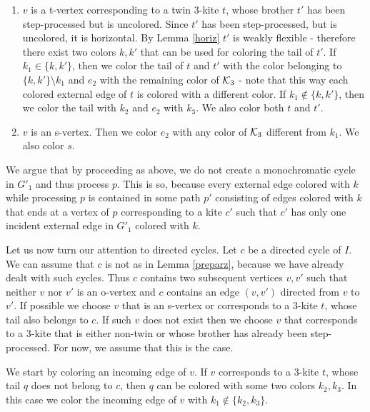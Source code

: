 \documentclass[a4, 11pt]{article}
\newcommand{\<}{\langle}
\renewcommand{\>}{\rangle}
\newcommand{\Kt}{{\cal K}_3}
\begin{document}
\begin{enumerate}
\item $v$ is a t-vertex corresponding to a twin $3$-kite $t$, whose brother $t'$ has  been step-processed but is uncolored. Since $t'$ has been step-processed, but is uncolored, it is horizontal.  By Lemma \ref{horiz} $t'$ is weakly flexible - therefore there exist two colors $k, k'$ that can be used for coloring the tail of $t'$. If $k_1 \in \{k,k'\}$, then we color the tail of $t$ and $t'$ with the color belonging to  $\{k,k'\} \setminus k_1$ and $e_2$ with the remaining color of $\Kt$ - note that this way each colored external edge of $t$ is colored with a different color.  If $k_1 \notin \{k,k'\}$, then we color the tail with $k_2$ and $e_2$ with $k_3$.  We also color both $t$ and $t'$.


\item $v$ is an s-vertex. Then we color $e_2$ with any color of $\Kt$ different from $k_1$. We also color $s$.

 
\end{enumerate}

We argue that by proceeding as above, we do not create a monochromatic cycle in $G'_1$ and thus process $p$. This is so, because every external edge colored with $k$ while processing $p$ is contained in some  path $p'$ consisting of edges colored with $k$ that ends at a vertex of $p$ corresponding to a kite $c'$ such that $c'$ has only one incident external edge in $G'_1$ colored with $k$.


Let us now turn our attention to directed cycles. Let $c$ be a  directed cycle of $I$. We can assume that $c$ is not as in Lemma \ref{preparz}, because we have already dealt with such cycles. Thus $c$ contains two subsequent vertices  $v, v'$ such that neither $v$ nor $v'$ is an o-vertex and $c$ contains an edge $(v,v')$ directed from $v$ to $v'$. If possible we choose $v$ that is an s-vertex or corresponds to a $3$-kite $t$, whose tail also belongs to $c$. If such $v$ does not exist then we choose $v$ that corresponds to a $3$-kite that is either non-twin or whose brother has already been step-processed. For now, we assume that this is the case.

 We start by coloring an incoming edge of $v$. If $v$ corresponds to a $3$-kite $t$, whose tail $q$ does not belong to $c$, then $q$ can be colored with some two colors $k_2, k_3$. In this case we color the incoming edge of $v$ with $k_1 \notin \{k_2, k_3\}$.
\end{document}
